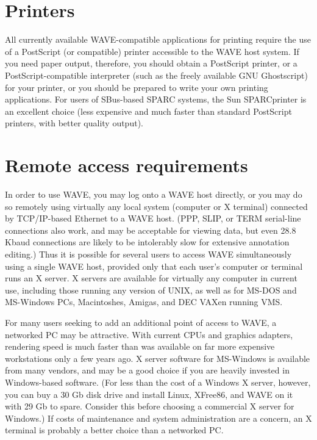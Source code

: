 \documentclass[twoside]{book}
\newcommand{\WAVE}{{\sf WAVE}\xspace}
\begin{document}
\section{Printers}

All currently available \WAVE{}-compatible applications for printing
require the use of a PostScript (or compatible) printer accessible to
the \WAVE{} host
\index{WAVE host@\WAVE{} host}
system.  If you need
paper output, therefore, you should obtain a PostScript printer, or a
PostScript-compatible interpreter (such as the freely available GNU
Ghostscript) for your printer, or you should be prepared to write your
own printing applications.  For users of SBus-based SPARC systems, the
Sun SPARC\-printer is an excellent choice (less expensive and much
faster than standard PostScript printers, with better quality output).

\section{Remote access requirements}

In order to use \WAVE{}, you may log onto a \WAVE{} host directly, or you
may do so remotely using virtually any local system (computer or X
terminal) connected by TCP/IP-based Ethernet to a \WAVE{} host.  (PPP,
SLIP, or TERM serial-line connections also work, and may be acceptable
for viewing data, but even 28.8 Kbaud connections are likely to be
intolerably slow for extensive annotation editing.)  Thus it is
possible for several users to access \WAVE{} simultaneously using a
single \WAVE{} host, provided only that each user's computer or terminal
runs an X server.  X servers are available for virtually any computer
in current use, including those running any version of UNIX, as well
as for MS-DOS and MS-Windows PCs, Macintoshes, Amigas, and DEC VAXen
running VMS.

 For many users seeking to
add an additional point of access to \WAVE{}, a networked PC may be attractive.
With current CPUs and graphics adapters, rendering speed is much faster than
was available on far more expensive workstations only a few years ago.  X
server software for MS-Windows is available from many vendors, and may be a
good choice if you are heavily invested in Windows-based software.  (For less
than the cost of a Windows X server, however, you can buy a 30 Gb disk drive
and install Linux, XFree86, and \WAVE{} on it with 29 Gb to spare.  Consider
this before choosing a commercial X server for Windows.)  If costs of
maintenance and system administration are a concern, an X terminal is probably
a better choice than a networked PC.
\end{document}

